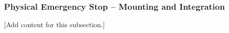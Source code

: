 
\subsubsection{Physical Emergency Stop -- Mounting and Integration}
\label{subsubsec:design_4_1_physical_estop_mounting_integration}

[Add content for this subsection.]
